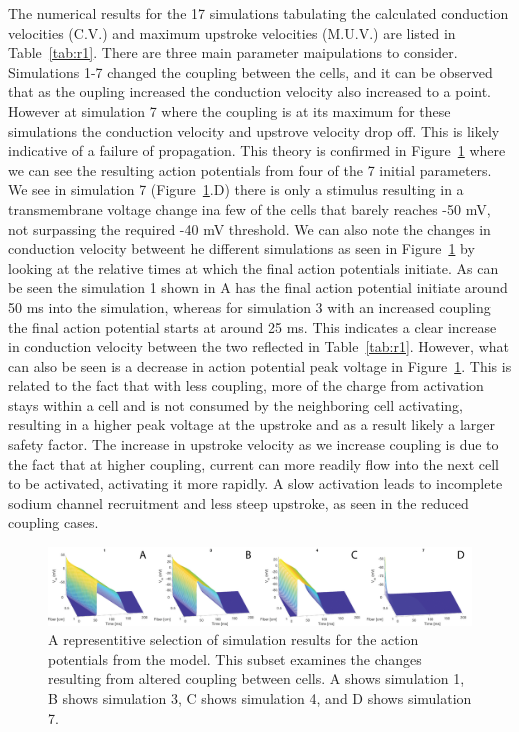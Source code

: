 \documentclass[12pt]{article}
\begin{document}
The numerical results for the 17 simulations tabulating the calculated conduction velocities (C.V.) and maximum upstroke velocities (M.U.V.) are listed in Table~\ref{tab:r1}. There are three main parameter maipulations to consider. Simulations 1-7 changed the coupling between the cells, and it can be observed that as the oupling increased the conduction velocity also increased to a point. However at simulation 7 where the coupling is at its maximum for these simulations the conduction velocity and upstrove velocity drop off. This is likely indicative of a failure of propagation. This theory is confirmed in Figure~\ref{fig:r1} where we can see the resulting action potentials from four of the 7 initial parameters. We see in simulation 7 (Figure~\ref{fig:r1}.D) there is only a stimulus resulting in a transmembrane voltage change ina  few of the cells that barely reaches -50 mV, not surpassing the required -40 mV threshold. We can also note the changes in conduction velocity betweent he different simulations as seen in Figure~\ref{fig:r1} by looking at the relative times at which the final action potentials initiate. As can be seen the simulation 1 shown in A has the final action potential initiate around 50 ms into the simulation, whereas for simulation 3 with an increased coupling the final action potential starts at around 25 ms. This indicates a clear increase in conduction velocity between the two reflected in Table~\ref{tab:r1}. However, what can also be seen is a decrease in action potential peak voltage in Figure~\ref{fig:r1}. This is related to the fact that with less coupling, more of the charge from activation stays within a cell and is not consumed by the neighboring cell activating, resulting in a higher peak voltage at the upstroke and as a result likely a larger safety factor. The increase in upstroke velocity as we increase coupling is due to the fact that at higher coupling, current can more readily flow into the next cell to be activated, activating it more rapidly. A slow activation leads to incomplete sodium channel recruitment and less steep upstroke, as seen in the reduced coupling cases.



\begin{figure}[H]
	\centering
	\includegraphics[width=\textwidth]{Figures/Fig1.png}
	\caption{A representitive selection of simulation results for the action potentials from the model. This subset examines the changes resulting from altered coupling between cells. A shows simulation 1, B shows simulation 3, C shows simulation 4, and D shows simulation 7.}
	\label{fig:r1}
\end{figure}
\end{document}
